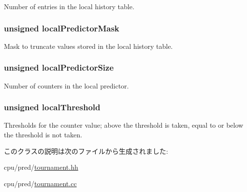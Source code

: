 \label{classTournamentBP_a71759b087accf553cc72b42bbd20dacd}
Number of entries in the local history table. \hypertarget{classTournamentBP_a260a954fa701712cdc113f3f9d0fc9ee}{
\subsubsection[{localPredictorMask}]{\setlength{\rightskip}{0pt plus 5cm}unsigned {\bf localPredictorMask}}}
\label{classTournamentBP_a260a954fa701712cdc113f3f9d0fc9ee}
Mask to truncate values stored in the local history table. \hypertarget{classTournamentBP_ad980634448337df2bf521bc96fd5653d}{
\subsubsection[{localPredictorSize}]{\setlength{\rightskip}{0pt plus 5cm}unsigned {\bf localPredictorSize}}}
\label{classTournamentBP_ad980634448337df2bf521bc96fd5653d}
Number of counters in the local predictor. \hypertarget{classTournamentBP_ad1e9eb27631bc79b7aaf699c608ab9e9}{
\subsubsection[{localThreshold}]{\setlength{\rightskip}{0pt plus 5cm}unsigned {\bf localThreshold}}}
\label{classTournamentBP_ad1e9eb27631bc79b7aaf699c608ab9e9}
Thresholds for the counter value; above the threshold is taken, equal to or below the threshold is not taken. 

このクラスの説明は次のファイルから生成されました:\begin{DoxyCompactItemize}
\item 
cpu/pred/\hyperlink{tournament_8hh}{tournament.hh}\item 
cpu/pred/\hyperlink{tournament_8cc}{tournament.cc}\end{DoxyCompactItemize}
